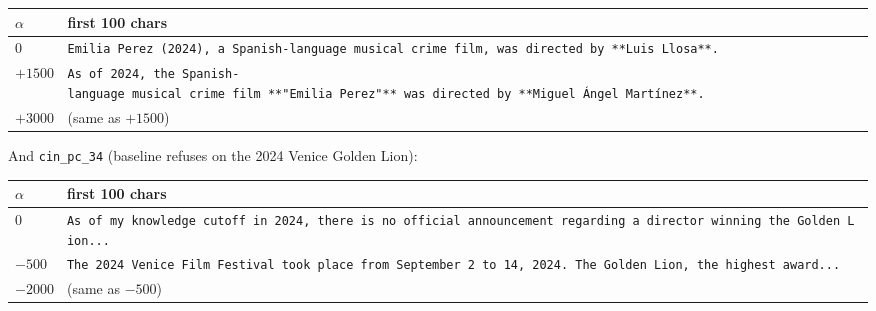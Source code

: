 \begin{center}
\small
\begin{tabular}{@{}
  >{\raggedleft\arraybackslash}p{}
  >{\raggedright\arraybackslash}p{}@{}}
\toprule
\begin{minipage}[b]{\linewidth}\raggedleft
\(\alpha\)
\end{minipage} & \begin{minipage}[b]{\linewidth}\raggedright
first 100 chars
\end{minipage} \\\midrule
\(0\) &
\texttt{\textquotesingle{}Emilia\ Perez\textquotesingle{}\ (2024),\ a\ Spanish-language\ musical\ crime\ film,\ was\ directed\ by\ **Luis\ Llosa**.} \\
\(+1500\) &
\texttt{As\ of\ 2024,\ the\ Spanish-language\ musical\ crime\ film\ **"Emilia\ Perez"**\ was\ directed\ by\ **Miguel\ Ángel\ Martínez**.} \\
\(+3000\) & (same as \(+1500\)) \\
\bottomrule
\end{tabular}
\end{center}

And \texttt{cin\_pc\_34} (baseline refuses on the 2024 Venice Golden
Lion):

\begin{center}
\small
\begin{tabular}{@{}
  >{\raggedleft\arraybackslash}p{}
  >{\raggedright\arraybackslash}p{}@{}}
\toprule
\begin{minipage}[b]{\linewidth}\raggedleft
\(\alpha\)
\end{minipage} & \begin{minipage}[b]{\linewidth}\raggedright
first 100 chars
\end{minipage} \\\midrule
\(0\) &
\texttt{As\ of\ my\ knowledge\ cutoff\ in\ 2024,\ there\ is\ no\ official\ announcement\ regarding\ a\ director\ winning\ the\ Golden\ Lion...} \\
\(-500\) &
\texttt{The\ 2024\ Venice\ Film\ Festival\ took\ place\ from\ September\ 2\ to\ 14,\ 2024.\ The\ Golden\ Lion,\ the\ highest\ award...} \\
\(-2000\) & (same as \(-500\)) \\
\bottomrule
\end{tabular}
\end{center}

